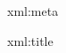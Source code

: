 %
%

\startxmlsetups xml:meta
  \startfrontmatter
    \placecontent
  \stopfrontmatter
\stopxmlsetups

\startxmlsetups xml:title
  \startstandardmakeup
    \title{}
  \stopstandardmakeup
\stopxmlsetups

